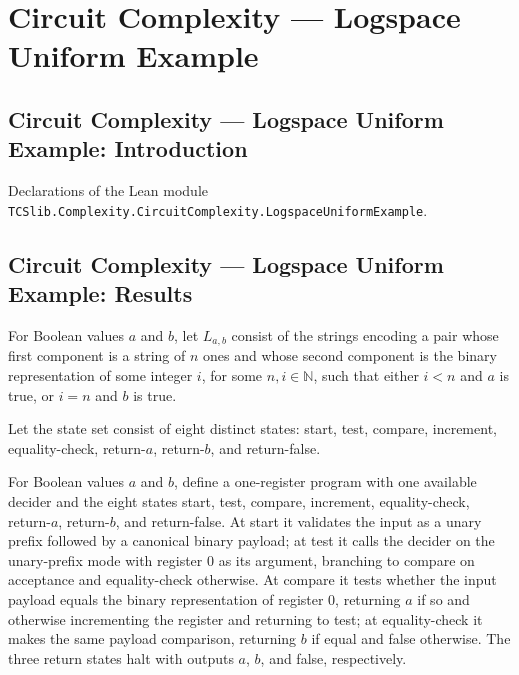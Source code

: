 \section{Circuit Complexity --- Logspace Uniform Example}
\subsection*{Circuit Complexity --- Logspace Uniform Example: Introduction}

Declarations of the Lean module \texttt{TCSlib.Complexity.CircuitComplexity.LogspaceUniformExample}.

\subsection*{Circuit Complexity --- Logspace Uniform Example: Results}

\begin{definition}
\label{BoolCircuit.AdjExample.leLang}
\leanok
{}
For Boolean values $a$ and $b$, let $L_{a,b}$ consist of the strings encoding a pair
whose first component is a string of $n$ ones and whose second component is the binary
representation of some integer $i$, for some $n,i\in\mathbb{N}$, such that either $i<n$
and $a$ is true, or $i=n$ and $b$ is true.
\end{definition}

\begin{definition}
\label{BoolCircuit.AdjExample.Lb}
\leanok
Let the state set consist of eight distinct states: start, test, compare, increment,
equality-check, return-$a$, return-$b$, and return-false.
\end{definition}

\begin{definition}
\label{BoolCircuit.AdjExample.leA}
\leanok
{}
For Boolean values $a$ and $b$, define a one-register program with one available decider
and the eight states start, test, compare, increment, equality-check, return-$a$,
return-$b$, and return-false. At start it validates the input as a unary prefix followed
by a canonical binary payload; at test it calls the decider on the unary-prefix mode
with register $0$ as its argument, branching to compare on acceptance and equality-check
otherwise. At compare it tests whether the input payload equals the binary
representation of register $0$, returning $a$ if so and otherwise incrementing the
register and returning to test; at equality-check it makes the same payload comparison,
returning $b$ if equal and false otherwise. The three return states halt with outputs
$a$, $b$, and false, respectively.
\end{definition}

